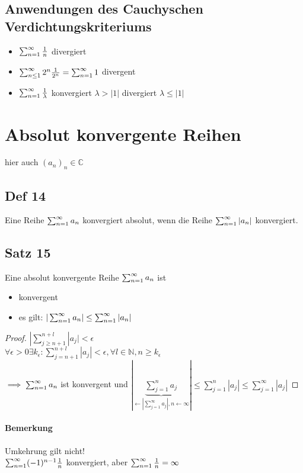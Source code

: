 \subsection{Anwendungen des Cauchyschen Verdichtungskriteriums}
\begin{itemize}
 \item $\sum_{n=1}^{\infty} \frac{1}{n}$ divergiert
 \item $\sum_{n\le1}^{\infty} 2^n \frac{1}{2^n} = \sum_{n=1}^{\infty} 1$ divergent
 \item $\sum_{n=1}^{\infty} \frac{1}{\lambda} $ konvergiert $\lambda > |1|$ divergiert $\lambda \le |1|$
\end{itemize}

\section{Absolut konvergente Reihen}
hier auch $(a_n)_n \in \mathbb{C}$
\subsection{Def 14}
Eine Reihe $\sum_{n=1}^{\infty} a_n$ konvergiert absolut, wenn die Reihe $\sum_{n=1}^{\infty} |a_n| $ konvergiert.

\subsection{Satz 15}
Eine absolut konvergente Reihe $\sum_{n=1}^{\infty} a_n$ ist 
\begin{itemize}
 \item konvergent
 \item es gilt: $|\sum_{n=1}^{\infty} a_n| \le \sum_{n=1}^{\infty} |a_n| $
\end{itemize}
\begin{proof}
  $|\sum_{j\geq n+1}^{n+l} |a_j| < \epsilon$\\
  $\forall \epsilon > 0 \exists k_\epsilon : \sum_{j=n+1}^{n+l} |a_j| < \epsilon , \forall l \in \mathbb{N}, n \geq k_\epsilon$\\
  $\implies \sum_{n=1}^{\infty} a_n$ ist konvergent und $|\underbrace{\sum_{j=1}^n a_j}_{\leftarrow |\sum_{j=1}^\infty a_j|, n\leftarrow \infty}| \leq \sum_{j=1}^n |a_j| \leq \sum_{j=1}^\infty |a_j|$
\end{proof}

\paragraph{Bemerkung} Umkehrung gilt nicht!\\
$\sum_{n=1}^{\infty} (-1)^{n-1} \frac{1}{n}$ konvergiert, aber $\sum_{n=1}^{\infty} \frac{1}{n} = \infty$

